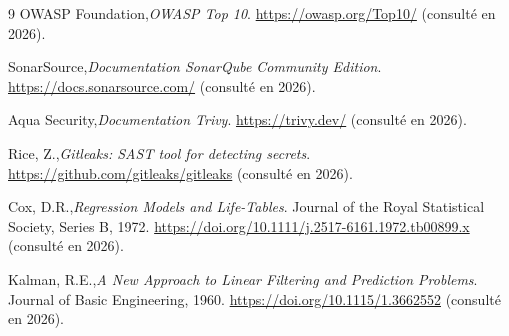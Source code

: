\begin{thebibliography}{9}
OWASP Foundation,\emph{OWASP Top 10}. \url{https://owasp.org/Top10/} (consulté en 2026).

SonarSource,\emph{Documentation SonarQube Community Edition}. \url{https://docs.sonarsource.com/} (consulté en 2026).

Aqua Security,\emph{Documentation Trivy}. \url{https://trivy.dev/} (consulté en 2026).

Rice, Z.,\emph{Gitleaks: SAST tool for detecting secrets}. \url{https://github.com/gitleaks/gitleaks} (consulté en 2026).

Cox, D.R.,\emph{Regression Models and Life-Tables}. Journal of the Royal Statistical Society, Series B, 1972. \url{https://doi.org/10.1111/j.2517-6161.1972.tb00899.x} (consulté en 2026).

Kalman, R.E.,\emph{A New Approach to Linear Filtering and Prediction Problems}. Journal of Basic Engineering, 1960. \url{https://doi.org/10.1115/1.3662552} (consulté en 2026).

\end{thebibliography}
